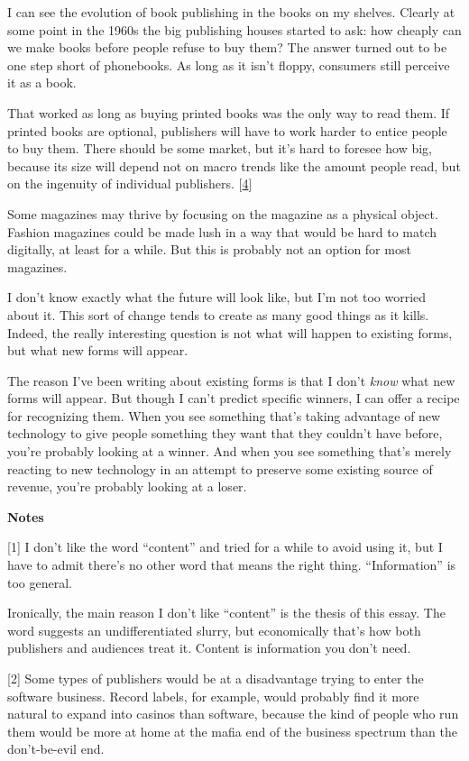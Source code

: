 I can see the evolution of book publishing in the books on my shelves.
Clearly at some point in the 1960s the big publishing houses started to
ask: how cheaply can we make books before people refuse to buy them? The
answer turned out to be one step short of phonebooks. As long as it
isn't floppy, consumers still perceive it as a book.

That worked as long as buying printed books was the only way to read
them. If printed books are optional, publishers will have to work harder
to entice people to buy them. There should be some market, but it's hard
to foresee how big, because its size will depend not on macro trends
like the amount people read, but on the ingenuity of individual
publishers. {[}\hyperref[f4n]{4}{]}

Some magazines may thrive by focusing on the magazine as a physical
object. Fashion magazines could be made lush in a way that would be hard
to match digitally, at least for a while. But this is probably not an
option for most magazines.

I don't know exactly what the future will look like, but I'm not too
worried about it. This sort of change tends to create as many good
things as it kills. Indeed, the really interesting question is not what
will happen to existing forms, but what new forms will appear.

The reason I've been writing about existing forms is that I don't
\emph{know} what new forms will appear. But though I can't predict
specific winners, I can offer a recipe for recognizing them. When you
see something that's taking advantage of new technology to give people
something they want that they couldn't have before, you're probably
looking at a winner. And when you see something that's merely reacting
to new technology in an attempt to preserve some existing source of
revenue, you're probably looking at a loser.

\textbf{Notes}

{[}1{]} I don't like the word ``content'' and tried for a while to avoid
using it, but I have to admit there's no other word that means the right
thing. ``Information'' is too general.

Ironically, the main reason I don't like ``content'' is the thesis of
this essay. The word suggests an undifferentiated slurry, but
economically that's how both publishers and audiences treat it. Content
is information you don't need.

{[}2{]} Some types of publishers would be at a disadvantage trying to
enter the software business. Record labels, for example, would probably
find it more natural to expand into casinos than software, because the
kind of people who run them would be more at home at the mafia end of
the business spectrum than the don't-be-evil end.

